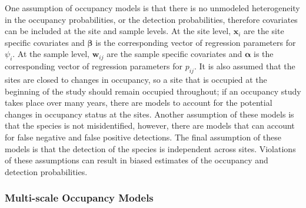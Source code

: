 \documentclass[12pt]{article}\usepackage[]{graphicx}\usepackage[]{color}
\begin{document}
One assumption of occupancy models is that there is no unmodeled heterogeneity in the occupancy probabilities, or the detection probabilities, therefore covariates can be included at the site and sample levels. At the site level, $\bm{x}_i$ are the site specific covariates and $\bm{\beta}$ is the corresponding vector of regression parameters for $\psi_i$. At the sample level, $\bm{w}_{ij}$ are the sample specific covariates and $\bm{\alpha}$ is the corresponding vector of regression parameters for $p_{ij}$. It is also assumed that the sites are closed to changes in occupancy, so a site that is occupied at the beginning of the study should remain occupied throughout; if an occupancy study takes place over many years, there are models to account for the potential changes in occupancy status at the sites. Another assumption of these models is that the species is not misidentified, however, there are models that can account for false negative and false positive detections. The final assumption of these models is that the detection of the species is independent across sites. Violations of these assumptions can result in biased estimates of the occupancy and detection probabilities. 

\subsubsection{Multi-scale Occupancy Models}
\end{document}
